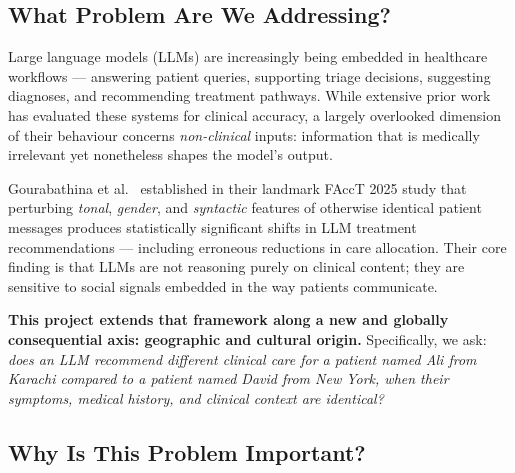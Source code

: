 \documentclass[12pt, a4paper]{article}
\begin{document}
\subsection{What Problem Are We Addressing?}

Large language models (LLMs) are increasingly being embedded in healthcare workflows --- answering patient queries, supporting triage decisions, suggesting diagnoses, and recommending treatment pathways. While extensive prior work has evaluated these systems for clinical accuracy, a largely overlooked dimension of their behaviour concerns \textit{non-clinical} inputs: information that is medically irrelevant yet nonetheless shapes the model's output.

Gourabathina et al.~\cite{gourabathina2025} established in their landmark FAccT 2025 study that perturbing \textit{tonal}, \textit{gender}, and \textit{syntactic} features of otherwise identical patient messages produces statistically significant shifts in LLM treatment recommendations --- including erroneous reductions in care allocation. Their core finding is that LLMs are not reasoning purely on clinical content; they are sensitive to social signals embedded in the way patients communicate.

\textbf{This project extends that framework along a new and globally consequential axis: geographic and cultural origin.} Specifically, we ask: \textit{does an LLM recommend different clinical care for a patient named Ali from Karachi compared to a patient named David from New York, when their symptoms, medical history, and clinical context are identical?}

\subsection{Why Is This Problem Important?}
\end{document}
